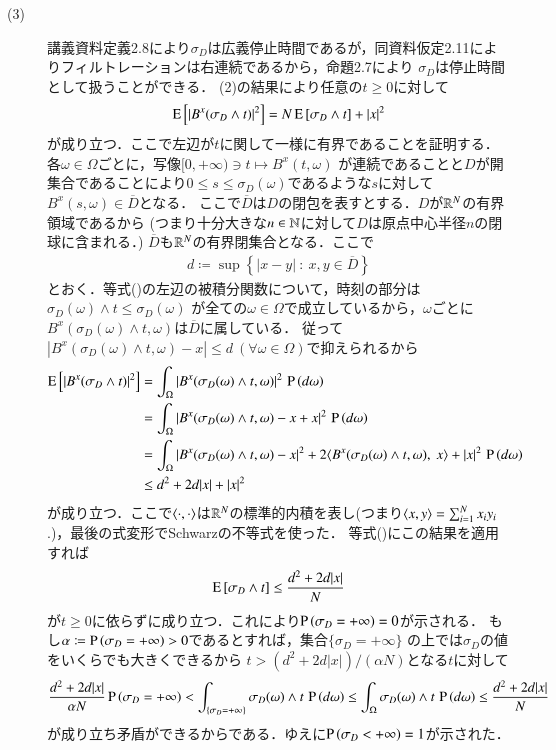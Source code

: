 \begin{prf}
\begin{description}
	\item[(3)] 講義資料定義2.8により$\sigma_D$は広義停止時間であるが，同資料仮定2.11によりフィルトレーションは右連続であるから，命題2.7により
		$\sigma_D$は停止時間として扱うことができる．
		(2)の結果により任意の$t \geq 0$に対して
		\begin{align}
			\operatorname{E} \left[ |B^x(\sigma_D \wedge t)|^2 \right] = N\operatorname{E} \left[ \sigma_D \wedge t \right] + |x|^2 \label{eq:stoc_report_Q2_3}
		\end{align}
		が成り立つ．ここで左辺が$t$に関して一様に有界であることを証明する．各$\omega \in \Omega$ごとに，写像$[0,+\infty) \ni t \longmapsto B^x(t, \omega)$
		が連続であることと$D$が開集合であることにより$0 \leq s \leq \sigma_D(\omega)$であるような$s$に対して$B^x(s, \omega) \in \overline{D}$となる．
		ここで$\overline{D}$は$D$の閉包を表すとする．$D$が$\mathbb{R}^N$の有界領域であるから
		(つまり十分大きな$n \in \mathbb{N}$に対して$D$は原点中心半径$n$の閉球に含まれる．)
		$\overline{D}$も$\mathbb{R}^N$の有界閉集合となる．ここで
		\begin{align}
			d \coloneqq \sup{}{\left\{|x - y|\ :\ x,y \in \overline{D} \right\}}
		\end{align}
		とおく．等式()の左辺の被積分関数について，時刻の部分は$\sigma_D(\omega) \wedge t \leq \sigma_D(\omega)$
		が全ての$\omega \in \Omega$で成立しているから，$\omega$ごとに$B^x(\sigma_D(\omega) \wedge t, \omega)$は$\overline{D}$に属している．
		従って$|B^x(\sigma_D(\omega) \wedge t, \omega) - x| \leq d \ (\forall \omega \in \Omega)$で抑えられるから
		\begin{align}
			\Exp{|B^x(\sigma_D \wedge t)|^2} 
			&= \int_{\Omega} |B^x(\sigma_D(\omega) \wedge t, \omega)|^2\, \prob{d\omega} \\
			&= \int_{\Omega} |B^x(\sigma_D(\omega) \wedge t, \omega) - x + x|^2\, \prob{d\omega} \\
			&= \int_{\Omega} |B^x(\sigma_D(\omega) \wedge t, \omega) - x|^2 + 2\inprod<B^x(\sigma_D(\omega) \wedge t, \omega),\ x> + |x|^2\, \prob{d\omega} \\
			&\leq d^2 + 2d|x| + |x|^2
		\end{align}
		が成り立つ．ここで$\inprod<\cdot, \cdot>$は$\mathbb{R}^N$の標準的内積を表し(つまり$\inprod<x, y> = \sum_{i=1}^{N}x_iy_i$.)，最後の式変形でSchwarzの不等式を使った．
		等式()にこの結果を適用すれば
		\begin{align}
			\operatorname{E} \left[ \sigma_D \wedge t \right] \leq \frac{d^2 + 2d|x|}{N}
		\end{align}
		が$t \geq 0$に依らずに成り立つ．これにより$\operatorname{P} \left(\sigma_D = +\infty\right) = 0$が示される．
		もし$\alpha \coloneqq \operatorname{P} \left(\sigma_D = +\infty\right) > 0$であるとすれば，集合$\{ \sigma_D = +\infty \}$
		の上では$\sigma_D$の値をいくらでも大きくできるから
		$t > (d^2 + 2d|x|)/(\alpha N)$となる$t$に対して
		\begin{align}
			\frac{d^2 + 2d|x|}{\alpha N} \operatorname{P} \left(\sigma_D = +\infty\right) 
			< \int_{\{\sigma_D = +\infty\}} \sigma_D(\omega) \wedge t\, \operatorname{P} \left(d\omega\right)
			\leq \int_{\Omega} \sigma_D(\omega) \wedge t\, \operatorname{P} \left(d\omega\right)
			\leq \frac{d^2 + 2d|x|}{N}
		\end{align}
		が成り立ち矛盾ができるからである．ゆえに$\operatorname{P} \left(\sigma_D < +\infty\right) = 1$が示された．
		\QED
\end{description}
\end{prf}